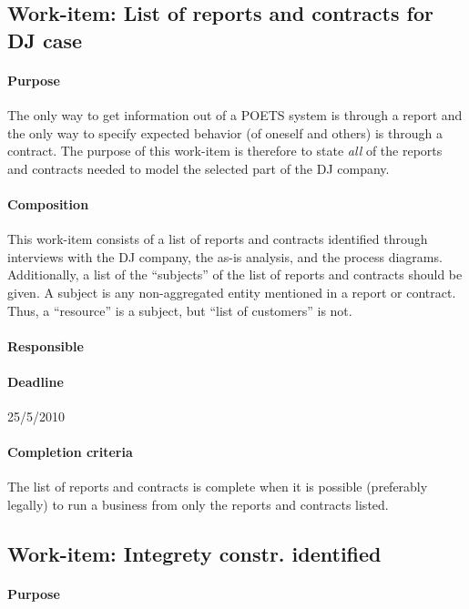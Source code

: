 \documentclass[envcountsame]{llncs}
\begin{document}
\subsection*{Work-item: List of reports and contracts for DJ case}
\paragraph{Purpose} The only way to get information out of a POETS
system is through a report and the only way to specify expected
behavior (of oneself and others) is through a contract. The purpose of
this work-item is therefore to state \emph{all} of the reports and
contracts needed to model the selected part of the DJ company.

\paragraph{Composition} This work-item consists of a list of reports
and contracts identified through interviews with the DJ company, the
as-is analysis, and the process diagrams. Additionally, a list of the
``subjects'' of the list of reports and contracts should be given. A
subject is any non-aggregated entity mentioned in a report or
contract. Thus, a ``resource'' is a subject, but ``list of customers''
is not.

\paragraph{Responsible} 

\paragraph{Deadline} 25/5/2010

\paragraph{Completion criteria} The list of reports and contracts is
complete when it is possible (preferably legally) to run a business
from only the reports and contracts listed. 

\subsection*{Work-item: Integrety constr. identified}
\paragraph{Purpose}
\end{document}

